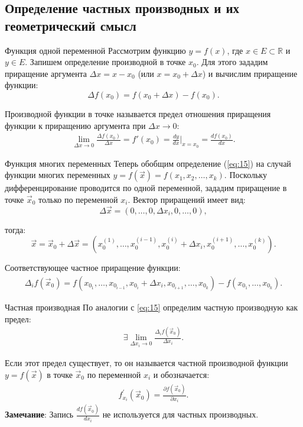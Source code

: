 \subsection{Определение частных производных и их геометрический смысл} \label{sec:2.1}

\begin{tbox}{Функция одной переменной}
	Рассмотрим функцию \( y = f(x) \), где \( x \in E \subset \mathbb{R} \) и \( y \in E \).
	Запишем определение производной в точке \( x_0 \). Для этого зададим приращение аргумента \( \Delta x = x - x_0 \) (или \( x = x_0 + \Delta x \)) и вычислим приращение функции:
	\[
	\Delta f(x_0) = f(x_0 + \Delta x) - f(x_0).
	\]

	Производной функции в точке называется предел отношения приращения функции к приращению аргумента при \( \Delta x \to 0 \):
	\begin{align}
		\lim_{\Delta x \to 0} \frac{\Delta f(x_0)}{\Delta x} = f'(x_0) = \frac{dy}{dx}\bigg|_{x = x_0} = \frac{df(x_0)}{dx}.
		\label{eq:15}
	\end{align}
\end{tbox}

\begin{tbox}{Функция многих переменных}
	Теперь обобщим определение (\ref{eq:15}) на случай функции многих переменных \( y = f(\vec{x}) = f(x_1, x_2, \dots, x_k) \). Поскольку дифференцирование проводится по одной переменной, зададим приращение в точке \( \vec{x}_0 \) только по переменной \( x_i \). Вектор приращений имеет вид:
	\[
	\Delta \vec{x} = (0, \dots, 0, \Delta x_i, 0, \dots, 0),
	\]

	тогда:
	\[
	\vec{x} = \vec{x}_0 + \Delta \vec{x} = \left(x_0^{(1)}, \dots, x_0^{(i-1)}, x_0^{(i)} + \Delta x_i, x_0^{(i+1)}, \dots, x_0^{(k)}\right).
	\]

	Соответствующее частное приращение функции:
	\begin{align}
		\Delta_i f(\vec{x}_0) = f\left(x_{0_1}, \dots, x_{0_{i-1}}, x_{0_i} + \Delta x_i, x_{0_{i+1}}, \dots, x_{0_k}\right) - f\left(x_{0_1}, \dots, x_{0_k}\right).
		\label{eq:16}
	\end{align}
\end{tbox}

\begin{tbox}{Частная производная}
	По аналогии с \cref{eq:15} определим частную производную как предел:
	\begin{align}
		\exists \lim_{\Delta x_i \to 0} \frac{\Delta_i f(\vec{x}_0)}{\Delta x_i}.
		\label{eq:17}
	\end{align}

	Если этот предел существует, то он называется частной производной функции \( y = f(\vec{x}) \) в точке \( \vec{x}_0 \) по переменной \( x_i \) и обозначается:
	\begin{align}
		f_{x_i}^{\prime}(\vec{x}_0) = \frac{\partial f(\vec{x}_0)}{\partial x_i}.
		\label{eq:18}
	\end{align}
	\textbf{Замечание}: Запись \( \frac{df(\vec{x}_0)}{dx_i} \) не используется для частных производных.
\end{tbox}

